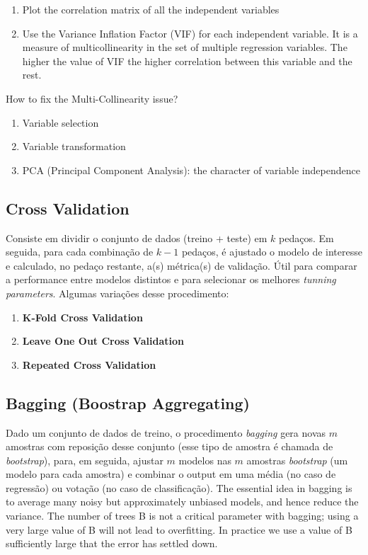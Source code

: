 \begin{enumerate}
    \item Plot the correlation matrix of all the independent variables
    \item Use the Variance Inflation Factor (VIF) for each independent variable. It is a measure of multicollinearity in the set of multiple regression variables. The higher the value of VIF the higher correlation between this variable and the rest.
\end{enumerate}

How to fix the Multi-Collinearity issue?
\begin{enumerate}
    \item Variable selection
    \item Variable transformation
    \item PCA (Principal Component Analysis): the character of variable independence
\end{enumerate}

\subsection{Cross Validation}
Consiste em dividir o conjunto de dados (treino + teste) em $k$ pedaços. Em seguida, para cada combinação de $k-1$ pedaços, é ajustado o modelo de interesse e calculado, no pedaço restante, a(s) métrica(s) de validação. Útil para comparar a performance entre modelos distintos e para selecionar os melhores  \textit{tunning parameters}. Algumas variações desse procedimento:

\begin{enumerate}
    \item \textbf{K-Fold Cross Validation}
    \item \textbf{Leave One Out Cross Validation}
    \item  \textbf{Repeated Cross Validation}
\end{enumerate}

\subsection{Bagging (Boostrap Aggregating)}
Dado um conjunto de dados de treino, o procedimento \textit{bagging} gera novas $m$ amostras com reposição desse conjunto (esse tipo de amostra é chamada de \textit{bootstrap}), para, em seguida, ajustar $m$ modelos nas $m$ amostras \textit{bootstrap} (um modelo para cada amostra) e combinar o output em uma média (no caso de regressão) ou votação (no caso de classificação). The essential idea in bagging is to average many noisy but approximately unbiased models, and hence reduce the variance. The number of trees B is not a critical parameter with bagging; using a very large value of B will not lead to overfitting. In practice we use a value of B sufficiently large that the error has settled down.

